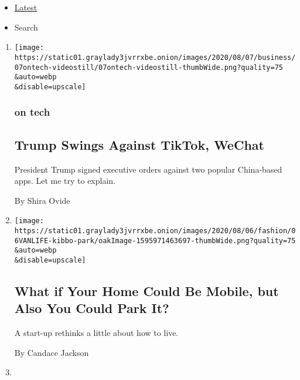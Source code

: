 \begin{itemize}
\tightlist
\item
  \protect\hyperlink{stream-panel}{Latest}
\item
  Search
\end{itemize}

\begin{enumerate}
\def\labelenumi{\arabic{enumi}.}
\item
  \href{/2020/08/07/technology/trump-tiktok-wechat.html}{}

  \texttt{[image: https://static01.graylady3jvrrxbe.onion/images/2020/08/07/business/07ontech-videostill/07ontech-videostill-thumbWide.png?quality=75\\\&auto=webp\\\&disable=upscale]}

  \hypertarget{on-tech}{%
  \subsubsection{on tech}\label{on-tech}}

  \hypertarget{trump-swings-against-tiktok-wechat}{%
  \subsection{Trump Swings Against TikTok,
  WeChat}\label{trump-swings-against-tiktok-wechat}}

  President Trump signed executive orders against two popular
  China-based apps. Let me try to explain.

  By Shira Ovide
\item
  \href{/2020/08/07/style/kibbo-van-life-startup.html}{}

  \texttt{[image: https://static01.graylady3jvrrxbe.onion/images/2020/08/06/fashion/06VANLIFE-kibbo-park/oakImage-1595971463697-thumbWide.png?quality=75\\\&auto=webp\\\&disable=upscale]}

  \hypertarget{what-if-your-home-could-be-mobile-but-also-you-could-park-it}{%
  \subsection{What if Your Home Could Be Mobile, but Also You Could Park
  It?}\label{what-if-your-home-could-be-mobile-but-also-you-could-park-it}}

  A start-up rethinks a little about how to live.

  By Candace Jackson
\item
  \href{/2020/08/07/style/gamer-chair-market-herman-miller.html}{}


\end{enumerate}
